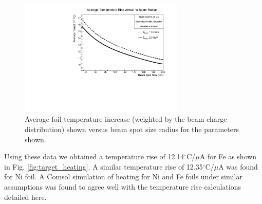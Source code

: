\documentclass[preprint,12pt]{elsarticle}
\begin{document}
\begin{figure}[ht]
\centering
\includegraphics[width=0.7\textwidth]{FeFoilHeatingdTvsSpotSize.pdf}
\caption{Average foil temperature increase (weighted by the beam charge distribution) shown versus beam spot size radius for the parameters shown.}
\label{fig:spotsize_dep}
\end{figure}
Using these data we obtained a temperature rise of 12.14$^\circ$C/$\mu$A for Fe as shown in Fig. \ref{fig:target_heating}. A similar temperature rise of 12.35$^\circ$C/$\mu$A was found for Ni foil. A {\sc Comsol} simulation of heating for Ni and Fe foils under similar assumptions was found to agree well with the temperature rise calculations detailed here. 
\end{document}
